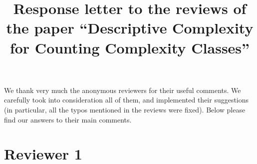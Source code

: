 \documentclass[a4paper]{article}
\begin{document}
\title{Response letter to the reviews of the paper ``Descriptive Complexity for Counting Complexity Classes''}

\maketitle

We thank very much the anonymous reviewers for their useful comments. We carefully took into consideration all of them, and implemented their suggestions (in particular, all the typos mentioned in the reviews were fixed). Below please find our answers to their main comments.

\section*{Reviewer 1}
\end{document}
